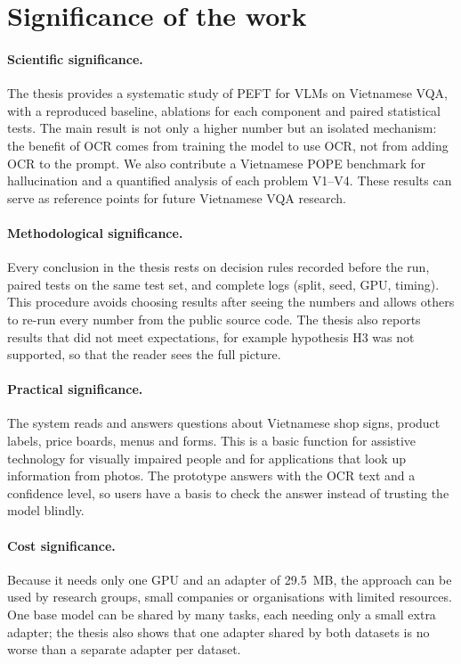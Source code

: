 \section{Significance of the work}
\label{sec:intro-significance}

\paragraph{Scientific significance.} The thesis provides a systematic study of PEFT
for VLMs on Vietnamese VQA, with a reproduced baseline, ablations for each component
and paired statistical tests. The main result is not only a higher number but an
isolated mechanism: the benefit of OCR comes from training the model to use OCR, not
from adding OCR to the prompt. We also contribute a Vietnamese POPE benchmark
for hallucination and a quantified analysis of each problem V1--V4. These results can
serve as reference points for future Vietnamese VQA research.

\paragraph{Methodological significance.} Every conclusion in the thesis rests on
decision rules recorded before the run, paired tests on the same test set, and
complete logs (split, seed, GPU, timing). This procedure avoids choosing results
after seeing the numbers and allows others to re-run every number from the public
source code. The thesis also reports results that did not meet expectations, for
example hypothesis H3 was not supported, so that the reader sees the full picture.

\paragraph{Practical significance.} The system reads and answers questions about
Vietnamese shop signs, product labels, price boards, menus and forms. This is a basic
function for assistive technology for visually impaired people and for applications
that look up information from photos. The prototype answers with the OCR text and a
confidence level, so users have a basis to check the answer instead of trusting the
model blindly.

\paragraph{Cost significance.} Because it needs only one GPU and an adapter of
29.5~MB, the approach can be used by research groups, small companies or
organisations with limited resources. One base model can be shared by many tasks,
each needing only a small extra adapter; the thesis also shows that one adapter shared
by both datasets is no worse than a separate adapter per dataset.

